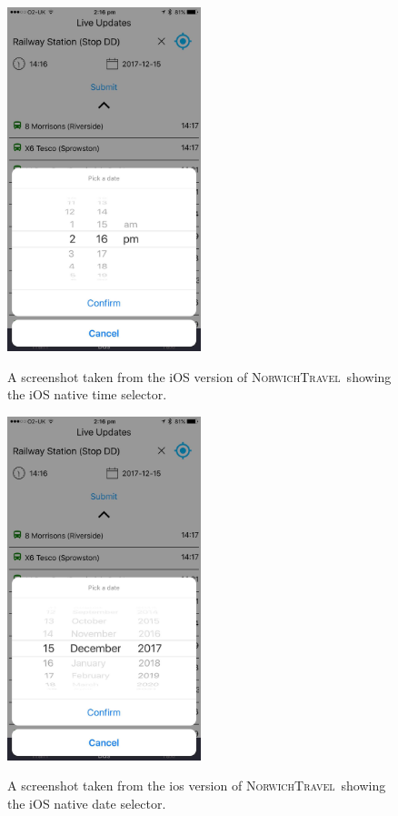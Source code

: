 \documentclass[cmpstyle]{ueacmpstyle}
\newcommand{\nt}{\textsc{NorwichTravel}}
\begin{document}
		\begin{figure}
			\centering
			\includegraphics[height=10cm]{images/ios-time.jpg}\\
			\caption{A screenshot taken from the iOS version of \nt \ showing the iOS native time selector.}\label{fig:ios-time}
		\end{figure}
		\begin{figure}
			\centering
			\includegraphics[height=10cm]{images/ios-date.jpg}\\
			\caption{A screenshot taken from the ios version of \nt \ showing the iOS native date selector.}\label{fig:ios-date}
		\end{figure}
\end{document}
